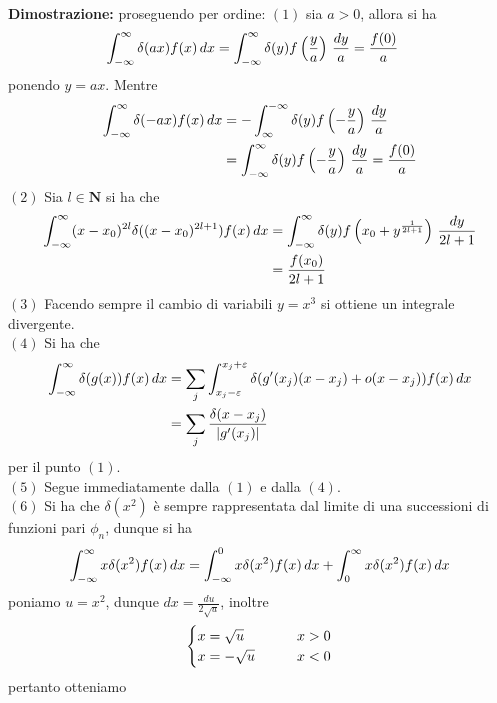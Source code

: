 \documentclass{article}
\begin{document}
\textbf{Dimostrazione:} proseguendo per ordine: $(1)$ sia $a > 0$, allora si ha
\begin{align}
    \int_{-\infty}^\infty \delta(ax)f(x) \, dx &= \int_{-\infty}^\infty \delta(y)f\left(\frac{y}{a}\right) \, \frac{dy}{a} = \frac{f(0)}{a} \notag
\end{align}
ponendo $y = ax$. Mentre
\begin{align}
    \int_{-\infty}^\infty \delta(-ax)f(x) \, dx &= -\int_\infty^{-\infty} \delta(y)f\left(-\frac{y}{a}\right) \, \frac{dy}{a} \notag \\
    &= \int_{-\infty}^\infty \delta(y)f\left(-\frac{y}{a}\right) \, \frac{dy}{a} = \frac{f(0)}{a} \notag
\end{align}
$(2)$ Sia $l \in \mathbf{N}$ si ha che
\begin{align}
    \int_{-\infty}^\infty (x - x_0)^{2l}\delta((x - x_0)^{2l + 1})f(x) \, dx &= \int_{-\infty}^\infty \delta(y)f\left(x_0 + y^{\frac{1}{2l + 1}}\right) \, \frac{dy}{2l + 1} \notag \\
    &= \frac{f(x_0)}{2l + 1} \notag
\end{align}
$(3)$ Facendo sempre il cambio di variabili $y = x^3$ si ottiene un integrale divergente. \\
$(4)$ Si ha che
\begin{align}
    \int_{-\infty}^\infty \delta(g(x))f(x) \, dx &= \sum_j\int_{x_j - \varepsilon}^{x_j + \varepsilon}\delta(g'(x_j)(x - x_j) + o(x - x_j))f(x) \, dx \notag \\
    &= \sum_j\frac{\delta(x - x_j)}{|g'(x_j)|} \notag
\end{align}
per il punto $(1)$. \\
$(5)$ Segue immediatamente dalla $(1)$ e dalla $(4)$. \\
$(6)$ Si ha che $\delta(x^2)$ è sempre rappresentata dal limite di una successioni di funzioni pari $\phi_n$, dunque si ha
\begin{gather}
    \int_{-\infty}^{\infty} x\delta(x^2)f(x) \, dx = \int_{-\infty}^0 x\delta(x^2)f(x) \, dx + \int_0^\infty x\delta(x^2)f(x) \, dx \notag
\end{gather}
poniamo $u = x^2$, dunque $dx = \frac{du}{2\sqrt{u}}$, inoltre
\begin{gather}
    \begin{cases}
        x = \sqrt{u} \qquad &x > 0 \\
        x = -\sqrt{u} \qquad &x < 0
    \end{cases} \notag
\end{gather}
pertanto otteniamo
\end{document}
